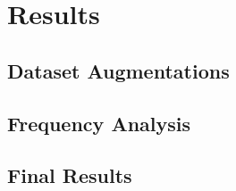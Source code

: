 
\chapter{Results}\label{chapter:results}

\section{Dataset Augmentations}\label{chapter:aug}
\section{Frequency Analysis}\label{chapter:freq}
\section{Final Results}\label{chapter:result}
